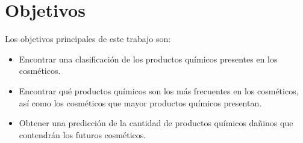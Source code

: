 \section{Objetivos}
\label{sec:goals}

Los objetivos principales de este trabajo son:
\begin{itemize}
 \item Encontrar una clasificación de los productos químicos presentes en los cosméticos.
 \item Encontrar qué productos químicos son los más frecuentes en los cosméticos, así como los cosméticos que mayor productos químicos presentan.
 \item Obtener una predicción de la cantidad de productos químicos dañinos que contendrán los futuros cosméticos.
\end{itemize}
























